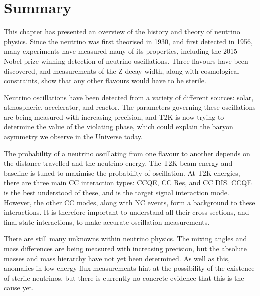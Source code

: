\section{Summary}

This chapter has presented an overview of the history and theory of neutrino physics. Since the neutrino was first theorised in 1930, and first detected in 1956, many experiments have measured many of its properties, including the 2015 Nobel prize winning detection of neutrino oscillations. Three flavours have been discovered, and measurements of the Z decay width, along with cosmological constraints, show that any other flavours would have to be sterile.

Neutrino oscillations have been detected from a variety of different sources: solar, atmospheric, accelerator, and reactor. The parameters governing these oscillations are being measured with increasing precision, and T2K is now trying to determine the value of the \CP violating phase, which could explain the baryon asymmetry we observe in the Universe today. 

The probability of a neutrino oscillating from one flavour to another depends on the distance travelled and the neutrino energy. The T2K beam energy and baseline is tuned to maximise the probability of oscillation. At T2K energies, there are three main CC interaction types: CCQE, CC Res, and CC DIS. CCQE is the best understood of these, and is the target signal interaction mode. However, the other CC modes, along with NC events, form a background to these interactions. It is therefore important to understand all their cross-sections, and final state interactions, to make accurate oscillation measurements.

There are still many unknowns within neutrino physics. The mixing angles and mass differences are being measured with increasing precision, but the absolute masses and mass hierarchy have not yet been determined. As well as this, anomalies in low energy flux measurements hint at the possibility of the existence of sterile neutrinos, but there is currently no concrete evidence that this is the cause yet. 

\newpage